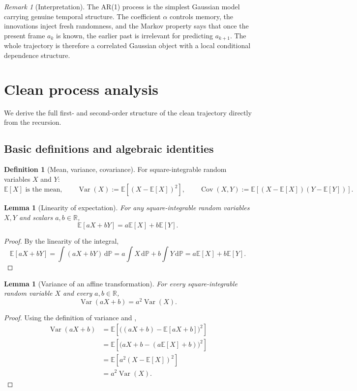 \documentclass[11pt]{article}
\numberwithin{equation}{section}
\newtheorem{lemma}[theorem]{Lemma}
\theoremstyle{definition}
\newtheorem{definition}[theorem]{Definition}
\theoremstyle{remark}
\newtheorem{remark}[theorem]{Remark}
\newcommand{\R}{\mathbb{R}}
\newcommand{\E}{\mathbb{E}}
\newcommand{\Var}{\operatorname{Var}}
\newcommand{\Cov}{\operatorname{Cov}}
\newcommand{\diff}{\,\mathrm{d}}
\begin{document}
\begin{remark}[Interpretation]
The AR(1) process is the simplest Gaussian model carrying genuine temporal structure. The coefficient $\alpha$ controls memory, the innovations inject fresh randomness, and the Markov property says that once the present frame $a_k$ is known, the earlier past is irrelevant for predicting $a_{k+1}$. The whole trajectory is therefore a correlated Gaussian object with a local conditional dependence structure.
\end{remark}

\section{Clean process analysis}\label{sec:clean}

We derive the full first- and second-order structure of the clean trajectory directly from the recursion.

\subsection{Basic definitions and algebraic identities}

\begin{definition}[Mean, variance, covariance]
For square-integrable random variables $X$ and $Y$:
\[
\E[X] \text{ is the mean},\qquad
\Var(X):=\E[(X-\E[X])^2],\qquad
\Cov(X,Y):=\E[(X-\E[X])(Y-\E[Y])].
\]
\end{definition}

\begin{lemma}[Linearity of expectation]\label{lem:linexp}
For any square-integrable random variables $X,Y$ and scalars $a,b\in\R$,
\[
\E[aX+bY]=a\E[X]+b\E[Y].
\]
\end{lemma}

\begin{proof}
By the linearity of the integral,
\[
\E[aX+bY]=\int (aX+bY)\diff\mathbb P
=a\int X\diff\mathbb P+b\int Y\diff\mathbb P
=a\E[X]+b\E[Y].
\]
\end{proof}

\begin{lemma}[Variance of an affine transformation]\label{lem:var_affine}
For every square-integrable random variable $X$ and every $a,b\in\R$,
\[
\Var(aX+b)=a^2\Var(X).
\]
\end{lemma}

\begin{proof}
Using the definition of variance and ,
\begin{align*}
\Var(aX+b)
&=\E\!\left[\big((aX+b)-\E[aX+b]\big)^2\right] \\
&=\E\!\left[\big(aX+b-(a\E[X]+b)\big)^2\right] \\
&=\E\!\left[a^2(X-\E[X])^2\right] \\
&=a^2\Var(X).
\end{align*}
\end{proof}
\end{document}
